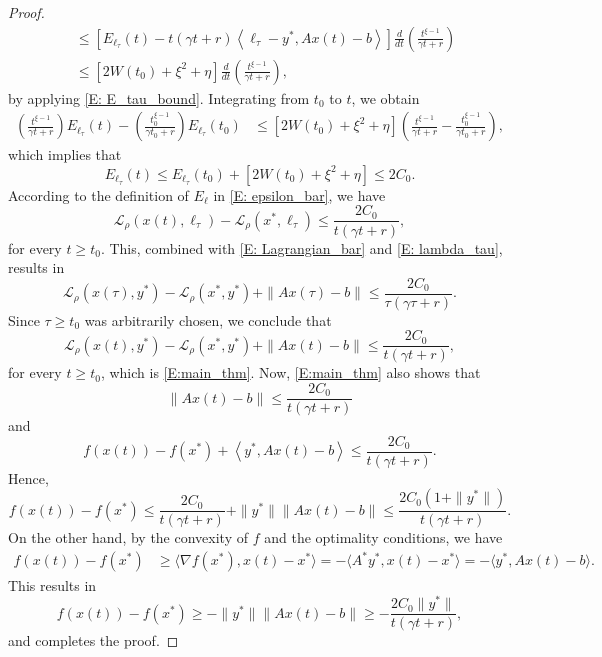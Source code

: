 \documentclass[10pt,a4paper]{amsart}
\begin{document}
\begin{proof}
\begin{align*}
&\le \left[E_{\ell_\tau}(t)-t(\gamma t+r) \left\langle \ell_\tau - y^*, Ax(t)-b \right\rangle\right]\frac{d}{dt}\left(\tfrac{t^{\xi-1}}{\gamma t+r}\right) \\
&\le \left[2W(t_0) + \xi^2 + \eta \right] \frac{d}{dt}\left(\tfrac{t^{\xi-1}}{\gamma t+r}\right),
\end{align*}
by applying \eqref{E: E_tau_bound}. Integrating from $t_0$ to $t$, we obtain
\begin{align*}
\left(\tfrac{t^{\xi-1}}{\gamma t+r}\right)E_{\ell_\tau}(t)-\left(\tfrac{t_0^{\xi-1}}{\gamma t_0+r}\right)E_{\ell_\tau}(t_0) 
&\le  \left[2W(t_0) + \xi^2 + \eta \right] \left(\tfrac{t^{\xi-1}}{\gamma t+r}-\tfrac{t_0^{\xi-1}}{\gamma t_0+r}\right),
\end{align*}
which implies that
$$E_{\ell_\tau}(t) \le E_{\ell_\tau}(t_0) + \left[2W(t_0) + \xi^2 + \eta \right] \le 2C_0.$$
According to the definition of $E_{\ell}$ in \eqref{E: epsilon_bar}, we have
$$ \mathcal{L}_\rho\left(x(t),\ell_\tau\right) - \mathcal{L}_\rho(x^*,\ell_\tau) \le \frac{2C_0}{t(\gamma t + r)},$$
for every $t\ge t_0$. This, combined with \eqref{E: Lagrangian_bar} and \eqref{E: lambda_tau}, results in
$$ \mathcal{L}_\rho\left(x(\tau),y^*\right) - \mathcal{L}_\rho(x^*,y^*) + \| Ax(\tau)-b \|
\le \frac{2C_0}{\tau(\gamma \tau + r)}. $$
Since $\tau\ge t_0$ was arbitrarily chosen, we conclude that
$$ \mathcal{L}_\rho\left(x(t),y^*\right) - \mathcal{L}_\rho(x^*,y^*) + \| Ax(t)-b \| 
\le \frac{2C_0}{t(\gamma t + r)}, $$
for every $t\ge t_0$, which is \eqref{E:main_thm}. Now, \eqref{E:main_thm} also shows that
$$ \| Ax(t)-b \| \le \frac{2C_0}{t(\gamma t + r)}$$
and
$$f\left( x(t) \right) - f(x^*) + \left\langle y^*, Ax(t) - b \right\rangle 
\le \frac{2C_0}{t(\gamma t + r)}.$$
Hence,
$$ f\left( x(t) \right) - f(x^*)  
\le \frac{2C_0}{t(\gamma t + r)} + \|y^* \| \left\| Ax(t) - b \right\| 
\le \frac{2C_0 \left(1+\|y^* \|\right)}{t(\gamma t + r)}. $$
On the other hand, by the convexity of $f$ and the optimality conditions, we have
\begin{align*}
f\left( x(t) \right) - f(x^*) 
&\ge \langle \nabla f(x^*), x(t) - x^* \rangle 
= - \langle A^* y^*, x(t) - x^* \rangle 
= - \langle y^*, Ax(t) - b \rangle.
\end{align*}
This results in
$$ f\left( x(t) \right) - f(x^*) 
\ge - \| y^* \|  \left\| Ax(t) - b \right\| 
\ge -\frac{2C_0 \| y^* \| }{t(\gamma t + r)},
$$
and completes the proof.
\end{proof}
\end{document}
